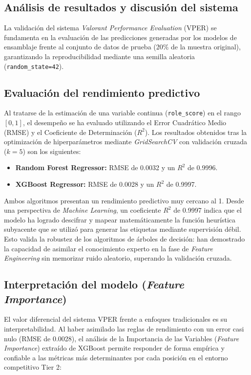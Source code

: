 \documentclass{ULBreport} %
\begin{document}
\begin{itemize}
\section{Análisis de resultados y discusión del sistema}

La validación del sistema \textit{Valorant Performance Evaluation} (VPER) se fundamenta en la evaluación de las predicciones generadas por los modelos de ensamblaje frente al conjunto de datos de prueba (20\% de la muestra original), garantizando la reproducibilidad mediante una semilla aleatoria (\texttt{random\_state=42}). 

\subsection{Evaluación del rendimiento predictivo}

Al tratarse de la estimación de una variable continua (\texttt{role\_score}) en el rango $[0,1]$, el desempeño se ha evaluado utilizando el Error Cuadrático Medio (RMSE) y el Coeficiente de Determinación ($R^2$). Los resultados obtenidos tras la optimización de hiperparámetros mediante \textit{GridSearchCV} con validación cruzada ($k=5$) son los siguientes:

\begin{itemize}
    \item \textbf{Random Forest Regressor:} RMSE de 0.0032 y un $R^2$ de 0.9996.
    \item \textbf{XGBoost Regressor:} RMSE de 0.0028 y un $R^2$ de 0.9997.
\end{itemize}

Ambos algoritmos presentan un rendimiento predictivo muy cercano al 1. Desde una perspectiva de \textit{Machine Learning}, un coeficiente $R^2$ de 0.9997 indica que el modelo ha logrado descifrar y mapear matemáticamente la función heurística subyacente que se utilizó para generar las etiquetas mediante supervisión débil. Esto valida la robustez de los algoritmos de árboles de decisión: han demostrado la capacidad de asimilar el conocimiento experto en la fase de \textit{Feature Engineering} sin memorizar ruido aleatorio, superando la validación cruzada.

\subsection{Interpretación del modelo (\textit{Feature Importance})}

El valor diferencial del sistema VPER frente a enfoques tradicionales es su interpretabilidad. Al haber asimilado las reglas de rendimiento con un error casi nulo (RMSE de 0.0028), el análisis de la Importancia de las Variables (\textit{Feature Importance}) extraído de XGBoost permite responder de forma empírica y confiable a las métricas más determinantes por cada posición en el entorno competitivo Tier 2:


\end{itemize}
\end{document}

